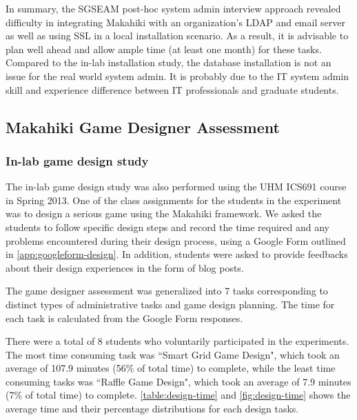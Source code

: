 In summary, the SGSEAM post-hoc system admin interview approach revealed difficulty in integrating Makahiki with an organization's LDAP and email server as well as using SSL in a local installation scenario. As a result, it is advisable to plan well ahead and allow ample time (at least one month) for these tasks.  Compared to the in-lab installation study, the database installation is not an issue for the real world system admin. It is probably due to the IT system admin skill and experience difference between  IT professionals and graduate students. 

\subsection{Makahiki Game Designer Assessment}

\subsubsection{In-lab game design study}
\label{sec:designer-in-lab-result}

The in-lab game design study was also performed using the UHM ICS691 course in Spring 2013. One of the class assignments for the students in the experiment was to design a serious game using the Makahiki framework. We asked the students to follow specific design steps and record the time required and any problems encountered during their design process, using a Google Form outlined in \autoref{app:googleform-design}. In addition, students were asked to provide feedbacks about their
design experiences in the form of blog posts. 

The game designer assessment was generalized into 7 tasks corresponding to
distinct types of administrative tasks and game design planning. The time for each task is
calculated from the Google Form responses. 

There were a total of 8 students who voluntarily participated in the experiments. The most time consuming task was ``Smart Grid Game Design", which took an average of 107.9 minutes (56\% of total time) to complete, while the least time consuming tasks was ``Raffle Game Design", which took an average of 7.9 minutes (7\% of total time) to complete. \autoref{table:design-time} and \autoref{fig:design-time} shows the average time and their percentage distributions for each design tasks.

